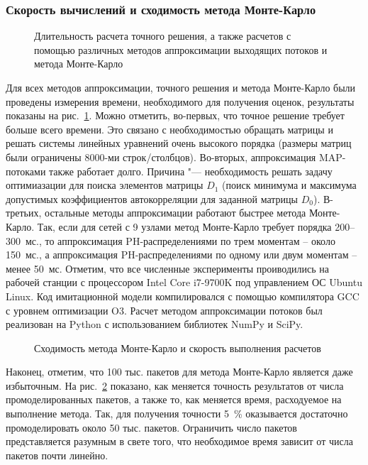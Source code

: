 \subsubsection{Скорость вычислений и сходимость метода Монте-Карло}

\begin{figure}[h]
  \caption{Длительность расчета точного решения, а также расчетов с помощью различных методов аппроксимации выходящих потоков и метода Монте-Карло}
  \label{fig:ch4_approximations_elapsed}
\end{figure}

Для всех методов аппроксимации, точного решения и метода Монте-Карло были проведены измерения времени, необходимого для получения оценок, результаты показаны на рис.~\ref{fig:ch4_approximations_elapsed}. Можно отметить, во-первых, что точное решение требует больше всего времени. Это связано с необходимостью обращать матрицы и решать системы линейных уравнений очень высокого порядка (размеры матриц были ограничены 8000-ми строк/столбцов). Во-вторых, аппроксимация MAP-потоками также работает долго. Причина "--- необходимость решать задачу оптимиазации для поиска элементов матрицы $D_1$ (поиск минимума и максимума допустимых коэффициентов автокорреляции для заданной матрицы $D_0$). В-третьих, остальные методы аппроксимации работают быстрее метода Монте-Карло. Так, если для сетей с 9 узлами метод Монте-Карло требует порядка 200--300~мс., то аппроксимация PH-распределениями по трем моментам -- около 150~мс., а аппроксимация PH-распределениями по одному или двум моментам -- менее 50~мс. Отметим, что все численные эксперименты проиводились на рабочей станции с процессором Intel Core i7-9700K под управлением ОС Ubuntu Linux. Код имитационной модели компилировался с помощью компилятора GCC с уровнем оптимизации O3. Расчет методом аппроксимации потоков был реализован на Python с использованием библиотек NumPy и SciPy.

\begin{figure}[h]
  \caption{Сходимость метода Монте-Карло и скорость выполнения расчетов}
  \label{fig:ch4_monte_carlo_performance}
\end{figure}

Наконец, отметим, что 100 тыс. пакетов для метода Монте-Карло является даже избыточным. На рис.~\ref{fig:ch4_monte_carlo_performance} показано, как меняется точность результатов от числа промоделированных пакетов, а также то, как меняется время, расходуемое на выполнение метода. Так, для получения точности 5~\% оказывается достаточно промоделировать около 50 тыс. пакетов. Ограничить число пакетов представляется разумным в свете того, что необходимое время зависит от числа пакетов почти линейно.




